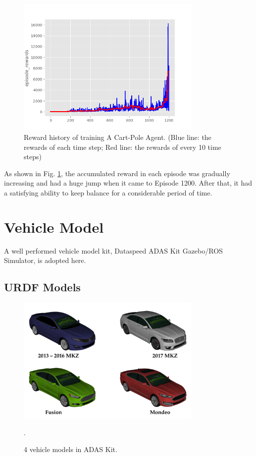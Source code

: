 \begin{figure}[h]
\centering
\includegraphics[width=0.8\textwidth]{figs/ch2/cartpole-epoch-1200}
\caption{Reward history of training A Cart-Pole Agent. (Blue line: the rewards of each time step; Red line: the rewards of every 10 time steps)}
\label{fig:cartpole-result}
\end{figure}

As shown in Fig. \ref{fig:cartpole-result}, the accumulated reward in each episode was gradually increasing and had a huge jump when it came to Episode 1200. After that, it had a satisfying ability to keep balance for a considerable period of time.

\section{Vehicle Model}

A well performed vehicle model kit, Dataspeed ADAS Kit Gazebo/ROS Simulator, is adopted here.

\subsection{URDF Models}

\begin{figure}[h]
\centering
\includegraphics[width=0.8\textwidth]{figs/ch2/mkz-cover}
\caption{4 vehicle models in ADAS Kit.}
\label{mkz-models}.
\end{figure}

